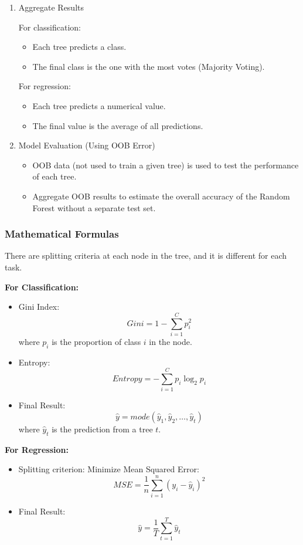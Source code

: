 \begin{enumerate}[label=Step \arabic*:, align=left, leftmargin=20pt,labelsep=1em]
    \item Aggregate Results

    \smallskip
    For classification:
    \begin{itemize}
        \item Each tree predicts a class.
        \item The final class is the one with the most votes (Majority Voting).
    \end{itemize}

    \smallskip
    For regression:
    \begin{itemize}
        \item Each tree predicts a numerical value.
        \item The final value is the average of all predictions.
    \end{itemize}

    \item Model Evaluation (Using OOB Error)
    \begin{itemize}
        \item OOB data (not used to train a given tree) is used to test the performance of each tree.
        \item Aggregate OOB results to estimate the overall accuracy of the Random Forest without a separate test set.
    \end{itemize}
\end{enumerate}

\smallskip

\subsubsection{Mathematical Formulas}\text{}

There are splitting criteria at each node in the tree, and it is different for each task.

\textbf{For Classification:}
\begin{itemize}
    \item Gini Index:
    \[Gini = 1 - \sum_{i=1}^C{p_i^2}\]
    where $p_i$ is the proportion of class $i$ in the node.
    \item Entropy:
    \[Entropy = - \sum_{i=1}^C{p_i \log_2{p_i}}\]
    \item Final Result:
    \[\hat{y} = mode(\hat{y}_1, \hat{y}_2, \ldots, \hat{y}_t)\]
    where $\hat{y}_t$ is the prediction from a tree $t$.
\end{itemize}

\textbf{For Regression:}
\begin{itemize}
    \item Splitting criterion: Minimize Mean Squared Error:
    \[MSE = \frac{1}{n} \sum_{i=1}^n{(y_i - \hat{y}_i)^2}\]
    \item Final Result:
    \[\hat{y} = \frac{1}{T} \sum_{t=1}^T{\hat{y}_t}\]
\end{itemize}

